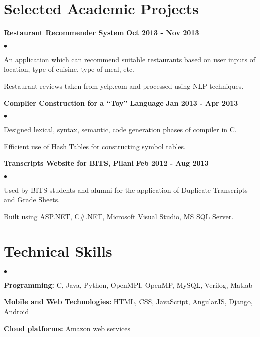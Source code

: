 \documentclass[margin,line]{res}
\newenvironment{list2}{
  \begin{list}{$\bullet$}{%
      \setlength{\itemsep}{0in}
      \setlength{\parsep}{0in} \setlength{\parskip}{0in}
      \setlength{\topsep}{0in} \setlength{\partopsep}{0in} 
      \setlength{\leftmargin}{0.2in}}}{\end{list}}
\begin{document}
\begin{resume}
\section{\sc Selected Academic Projects}

{\bf Restaurant Recommender System} \hfill {\bf Oct 2013 - Nov 2013}\\

\vspace{-.3cm}
\begin{list2}
\item An application which can recommend suitable restaurants based on user inputs of location, type of
cuisine, type of meal, etc.
\item Restaurant reviews taken from yelp.com and processed using NLP techniques.
\end{list2}

{\bf Complier Construction for a “Toy” Language} \hfill {\bf Jan 2013 - Apr 2013}\\

\vspace{-.3cm}
\begin{list2}
\item Designed lexical, syntax, semantic, code generation phases of compiler in C.
\item Efficient use of Hash Tables for constructing symbol tables.
\end{list2}

{\bf Transcripts Website for BITS, Pilani} \hfill {\bf Feb 2012 - Aug 2013}\\

\vspace{-.3cm}
\begin{list2}
\item Used by BITS students and alumni for the application of Duplicate Transcripts and Grade Sheets.
\item Built using ASP.NET, C\#.NET, Microsoft Visual Studio, MS SQL Server.
\end{list2}




\section{\sc Technical Skills} 
\begin{list2}

\item {\bf Programming:} C, Java, Python, OpenMPI, OpenMP, MySQL, Verilog, Matlab
\item {\bf Mobile and Web Technologies:} HTML, CSS, JavaScript, AngularJS, Django, Android
\item {\bf Cloud platforms:} Amazon web services
\end{list2}
 


\end{resume}
\end{document}
